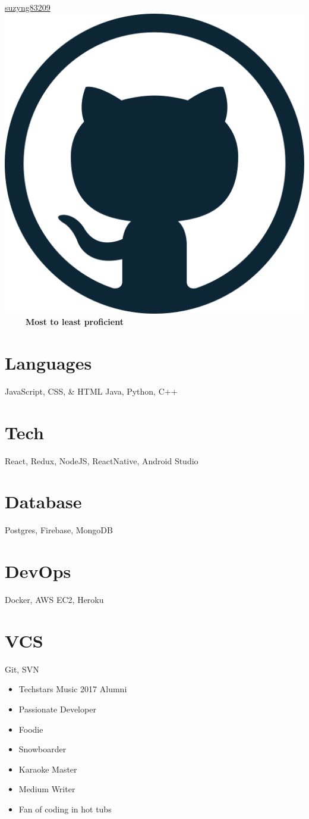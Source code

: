 \documentclass[]{friggeri-cv}
\begin{document}
\begin{aside}
  \href{https://github.com/suzyng83209}{suzyng83209 \includegraphics[scale=0.02]{github-512.png}}
  \
  \supersection{}
  \
  \supersection{}
  \
  \textbf{Most to least proficient}
  \section{Languages}
  JavaScript, CSS, \& HTML
  Java, Python, C++
  \section{Tech}
  React, Redux, NodeJS, ReactNative, Android Studio
  \section{Database}
  Postgres, Firebase, MongoDB
  \section{DevOps}
  Docker, AWS EC2, Heroku
  \section{VCS}
  Git, SVN
  \
  \supersection{}
  \
  \supersection{}
  \
  \begin{itemize}\raggedleft
  	\item[] Techstars Music 2017 Alumni
  	\item[] Passionate Developer
  	\item[] Foodie
  	\item[] Snowboarder
  	\item[] Karaoke Master
  	\item[] Medium Writer
  	\item[] Fan of coding in hot tubs
  \end{itemize}
\end{aside}
\end{document}
